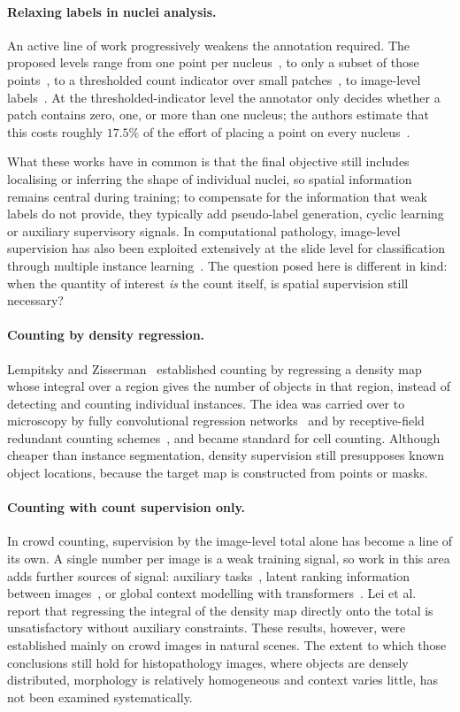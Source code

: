 \documentclass[pdflatex,sn-mathphys-num]{sn-jnl}
\begin{document}
\paragraph{Relaxing labels in nuclei analysis.} An active line of work progressively weakens the annotation
required. The proposed levels range from one point per nucleus~\cite{pseudoedgenet}, to only a subset of those
points~\cite{qu2020}, to a thresholded count indicator over small patches~\cite{lirnet}, to image-level
labels~\cite{cyclic}. At the thresholded-indicator level the annotator only decides whether a patch contains
zero, one, or more than one nucleus; the authors estimate that this costs roughly $17.5\%$ of the effort of
placing a point on every nucleus~\cite{lirnet}.

What these works have in common is that the final objective still includes localising or inferring the shape of
individual nuclei, so spatial information remains central during training; to compensate for the information
that weak labels do not provide, they typically add pseudo-label generation, cyclic learning or auxiliary
supervisory signals. In computational pathology, image-level supervision has also been exploited extensively at
the slide level for classification through multiple instance learning~\cite{campanella}. The question posed
here is different in kind: when the quantity of interest \emph{is} the count itself, is spatial supervision
still necessary?

\paragraph{Counting by density regression.} Lempitsky and Zisserman~\cite{lempitsky} established counting by
regressing a density map whose integral over a region gives the number of objects in that region, instead of
detecting and counting individual instances. The idea was carried over to microscopy by fully convolutional
regression networks~\cite{fcrn} and by receptive-field redundant counting schemes~\cite{countception}, and
became standard for cell counting. Although cheaper than instance segmentation, density supervision still
presupposes known object locations, because the target map is constructed from points or masks.

\paragraph{Counting with count supervision only.} In crowd counting, supervision by the image-level total alone
has become a line of its own. A single number per image is a weak training signal, so work in this area adds
further sources of signal: auxiliary tasks~\cite{matt}, latent ranking information between
images~\cite{sorting}, or global context modelling with transformers~\cite{transcrowd}. Lei et
al.~\cite{matt} report that regressing the integral of the density map directly onto the total is unsatisfactory
without auxiliary constraints. These results, however, were established mainly on crowd images in natural
scenes. The extent to which those conclusions still hold for histopathology images, where objects are densely
distributed, morphology is relatively homogeneous and context varies little, has not been examined
systematically.
\end{document}
